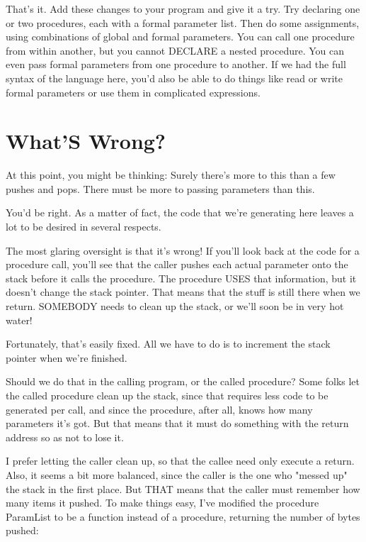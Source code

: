 That's  it. Add these changes to your program and give it a try. Try declaring one or two procedures, each with a formal parameter list. Then do some assignments, using combinations of global and formal  parameters. You  can  call one procedure  from  within another, but you cannot DECLARE a nested procedure. You can even pass formal parameters from one procedure to another. If  we had the  full  syntax  of the language here, you'd also be able to do things like read  or  write  formal  parameters  or  use  them in complicated expressions.

\section{What'S Wrong?}

At this point, you might be thinking: Surely there's more to this than a few pushes and  pops. There  must  be  more  to passing parameters than this.

You'd  be  right. As  a  matter  of fact, the code that  we're generating here leaves a lot to be desired in several respects.

The most glaring oversight is that it's wrong!   If  you'll  look back at the code for a procedure call, you'll see that the caller pushes each actual parameter onto the stack before  it  calls the procedure. The  procedure  USES that information, but it doesn't change the stack  pointer. That  means that the stuff is still there when we return. SOMEBODY needs to clean up  the  stack, or we'll soon be in very hot water!

Fortunately, that's  easily fixed. All we  have  to  do  is  to increment the stack pointer when we're finished.

Should  we  do  that  in  the  calling  program, or  the  called procedure?   Some folks let the called  procedure  clean  up  the stack, since  that  requires less code to be generated per call, and since the procedure, after  all, knows  how  many parameters it's got. But  that  means  that  it must do something with the return address so as not to lose it.

I prefer letting  the  caller  clean  up, so that the callee need only execute a return. Also, it seems a bit more balanced, since the caller is  the  one  who  "messed  up" the stack in the first place. But  THAT  means  that  the caller must remember how many items  it  pushed. To  make  things  easy, I've  modified  the procedure  ParamList to be a function  instead  of  a  procedure, returning the number of bytes pushed:

